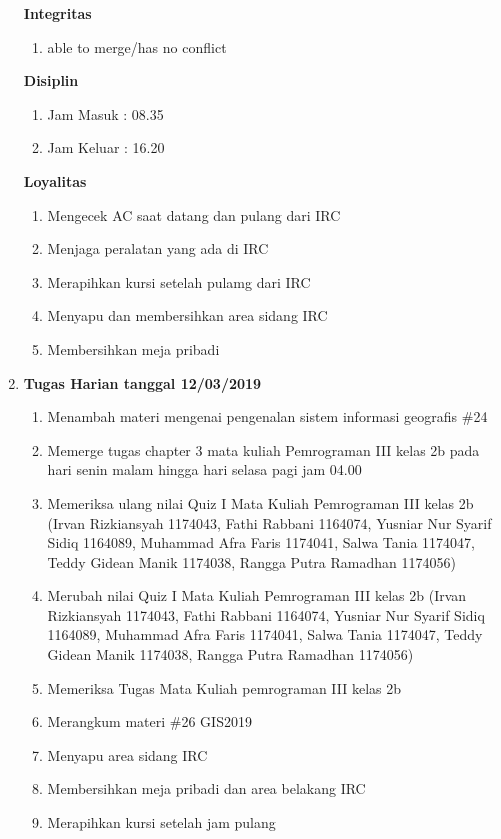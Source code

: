 \begin{enumerate}
\textbf{Integritas}
\begin{enumerate}
\item able to merge/has no conflict
\end{enumerate}


\textbf{Disiplin}
\begin{enumerate}
\item Jam Masuk : 08.35
\item Jam Keluar : 16.20
\end{enumerate}


\textbf{Loyalitas}
\begin{enumerate}
\item Mengecek AC saat datang dan pulang dari IRC
\item Menjaga peralatan yang ada di IRC
\item Merapihkan kursi setelah pulamg dari IRC
\item Menyapu dan membersihkan area sidang IRC
\item Membersihkan meja pribadi
\end{enumerate}


\item \textbf{Tugas Harian tanggal 12/03/2019}
\begin{enumerate}
\item Menambah materi mengenai pengenalan sistem informasi geografis \#24
\item Memerge tugas chapter 3 mata kuliah Pemrograman III kelas 2b pada hari senin malam hingga hari selasa pagi jam 04.00
\item Memeriksa ulang nilai Quiz I Mata Kuliah Pemrograman III kelas 2b (Irvan Rizkiansyah 1174043, Fathi Rabbani 1164074, Yusniar Nur Syarif Sidiq 1164089, Muhammad Afra Faris 1174041, Salwa Tania 1174047, Teddy Gidean Manik 1174038, Rangga Putra Ramadhan 1174056)
\item Merubah nilai Quiz I Mata Kuliah Pemrograman III kelas 2b (Irvan Rizkiansyah 1174043, Fathi Rabbani 1164074, Yusniar Nur Syarif Sidiq 1164089, Muhammad Afra Faris 1174041, Salwa Tania 1174047, Teddy Gidean Manik 1174038, Rangga Putra Ramadhan 1174056)
\item Memeriksa Tugas Mata Kuliah pemrograman III kelas 2b
\item Merangkum materi \#26 GIS2019
\item Menyapu area sidang IRC
\item Membersihkan meja pribadi dan area belakang IRC
\item Merapihkan kursi setelah jam pulang 
\end{enumerate}


\end{enumerate}
